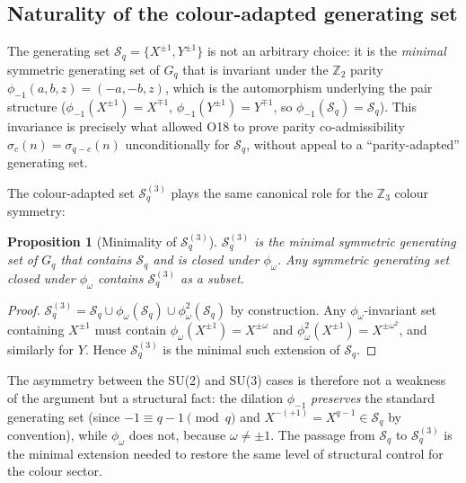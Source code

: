 \documentclass[11pt,a4paper]{article}
\newtheorem{proposition}[theorem]{Proposition}
\theoremstyle{definition}
\theoremstyle{remark}
\newcommand{\Gq}{G_q}
\newcommand{\Z}{\mathbb{Z}}
\newcommand{\Sq}{\mathcal{S}_q}
\begin{document}
    \subsection{Naturality of the colour-adapted generating set}
      \label{ssec:naturality}

      The generating set $\Sq = \{X^{\pm 1}, Y^{\pm 1}\}$ is not an arbitrary choice: it is the
      \emph{minimal} symmetric generating set of $\Gq$ that is invariant under the $\Z_2$ parity
      $\phi_{-1}(a,b,z) = (-a,-b,z)$, which is the automorphism underlying the pair structure
      ($\phi_{-1}(X^{\pm 1}) = X^{\mp 1}$, $\phi_{-1}(Y^{\pm 1}) = Y^{\mp 1}$, so
      $\phi_{-1}(\Sq) = \Sq$).
      This invariance is precisely what allowed O18 to prove parity co-admissibility
      $\sigma_c(n) = \sigma_{q-c}(n)$ unconditionally for $\Sq$, without appeal to a
      ``parity-adapted'' generating set.

      The colour-adapted set $\Sq^{(3)}$ plays the same canonical role for the $\Z_3$ colour
      symmetry:

      \begin{proposition}[Minimality of $\Sq^{(3)}$]
        \label{prop:minimality-adapted}
        $\Sq^{(3)}$ is the minimal symmetric generating set of $\Gq$ that contains $\Sq$ and is
        closed under $\phi_\omega$.
        Any symmetric generating set closed under $\phi_\omega$ contains $\Sq^{(3)}$ as a subset.
      \end{proposition}

      \begin{proof}
        $\Sq^{(3)} = \Sq \cup \phi_\omega(\Sq) \cup \phi_\omega^2(\Sq)$ by construction.
        Any $\phi_\omega$-invariant set containing $X^{\pm 1}$ must contain
        $\phi_\omega(X^{\pm 1}) = X^{\pm\omega}$ and $\phi_\omega^2(X^{\pm 1}) = X^{\pm\omega^2}$,
        and similarly for $Y$.
        Hence $\Sq^{(3)}$ is the minimal such extension of $\Sq$.
      \end{proof}

      The asymmetry between the SU(2) and SU(3) cases is therefore not a weakness of the
      argument but a structural fact: the dilation $\phi_{-1}$ \emph{preserves} the
      standard generating set (since $-1 \equiv q-1 \pmod{q}$ and $X^{-(+1)} = X^{q-1} \in \Sq$
      by convention), while $\phi_\omega$ does not, because $\omega \neq \pm 1$.
      The passage from $\Sq$ to $\Sq^{(3)}$ is the minimal extension needed to restore the same
      level of structural control for the colour sector.
\end{document}
